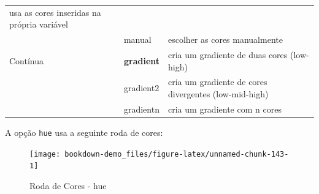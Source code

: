\documentclass[]{book}
\begin{document}
\begin{longtable}[]{@{}lll@{}}
\begin{minipage}[t]{0.68\columnwidth}
usa as cores inseridas na própria variável\strut
\end{minipage}\tabularnewline
\begin{minipage}[t]{0.12\columnwidth}\raggedright\strut
\strut
\end{minipage} & \begin{minipage}[t]{0.11\columnwidth}\raggedright\strut
manual\strut
\end{minipage} & \begin{minipage}[t]{0.68\columnwidth}\raggedright\strut
escolher as cores manualmente\strut
\end{minipage}\tabularnewline
\begin{minipage}[t]{0.12\columnwidth}\raggedright\strut
Contínua\strut
\end{minipage} & \begin{minipage}[t]{0.11\columnwidth}\raggedright\strut
\textbf{gradient}\strut
\end{minipage} & \begin{minipage}[t]{0.68\columnwidth}\raggedright\strut
cria um gradiente de duas cores (low-high)\strut
\end{minipage}\tabularnewline
\begin{minipage}[t]{0.12\columnwidth}\raggedright\strut
\strut
\end{minipage} & \begin{minipage}[t]{0.11\columnwidth}\raggedright\strut
gradient2\strut
\end{minipage} & \begin{minipage}[t]{0.68\columnwidth}\raggedright\strut
cria um gradiente de cores divergentes (low-mid-high)\strut
\end{minipage}\tabularnewline
\begin{minipage}[t]{0.12\columnwidth}\raggedright\strut
\strut
\end{minipage} & \begin{minipage}[t]{0.11\columnwidth}\raggedright\strut
gradientn\strut
\end{minipage} & \begin{minipage}[t]{0.68\columnwidth}\raggedright\strut
cria um gradiente com n cores\strut
\end{minipage}\tabularnewline
\bottomrule
\end{longtable}

A opção \texttt{hue} usa a seguinte roda de cores:

\begin{figure}

{\centering \texttt{[image: bookdown-demo\_files/figure-latex/unnamed-chunk-143-1]} 

}

\caption{Roda de Cores - hue}\label{fig:unnamed-chunk-143}
\end{figure}
\end{document}
